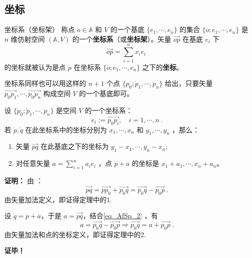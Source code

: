 \subsection{坐标}
\begin{definition}{坐标系（坐标架）}
称点 $\dot o\in\mathbb A$ 和 $V$ 的一个基底 $\{e_1,\cdots,e_n\}$ 的集合 $\{\dot o;e_1,\cdots,e_n\}$ 是 $n$ 维仿射空间 $(\mathbb A,V)$ 的一个\textbf{坐标系}（或\textbf{坐标架}）。矢量 $\overrightarrow{op}$ 在基底 ${e_i}$ 下
\begin{equation}
\overrightarrow{op}=\sum_{i=1}^n x_ie_i~
\end{equation}
的坐标就被认为是点 $\dot p$ 在坐标系 $\{\dot o;e_1,\cdots,e_n\}$ 之下的\textbf{坐标}。
\end{definition}
坐标系同样也可以用这样的 $n+1$ 个点 $\{\dot p_0;\dot p_1,\cdots,\dot p_n\}$ 给出，只要矢量 $\overrightarrow{p_0p_1},\cdots,\overrightarrow{p_0p_n}$ 构成空间 $V$ 的一个基底即可。
\begin{theorem}{}\label{the_AfSp_2}
设 $\{\dot p_0;\dot p_1,\cdots,\dot p_n\}$ 是空间 $V$ 的一个坐标系：
\begin{equation}
e_i:=\overrightarrow{p_0 p_i},\quad i=1,\cdots,n~.
\end{equation}
若 $\dot p,\dot q$ 在此坐标系中的坐标分别为 $x_1,\cdots,x_n$ 和 $y_1,\cdots,y_n$ ，那么：
\begin{enumerate}
\item 矢量 $\overrightarrow{pq}$ 在此基底之下的坐标为 $y_1-x_1,\cdots,y_n-x_n$;
\item 对任意矢量 $a=\sum\limits_{i=1}^n a_ie_i$ ，点 $\dot p+a$ 的坐标是 $x_1+a_1,\cdots,x_n+a_n$。
\end{enumerate}
\end{theorem} 
\textbf{证明：} 由 ：
\begin{equation}\label{eq_AfSp_2}
\overrightarrow{pq}=\overrightarrow{pp_0}+\overrightarrow{p_0q}=\overrightarrow{p_0q}-\overrightarrow{p_0p}~.
\end{equation}
由矢量加法定义，即证得定理中的1.

设 $\dot q=\dot p+a$，于是 $a=\overrightarrow{pq}$，结合\autoref{eq_AfSp_2} ，有
\begin{equation}
a=\overrightarrow{p_0q}-\overrightarrow{p_0p}\Rightarrow \overrightarrow{p_0q}=a+\overrightarrow{p_0p}~.
\end{equation}
由矢量加法和点的坐标定义，即证得定理中的2.

\textbf{证毕！}
